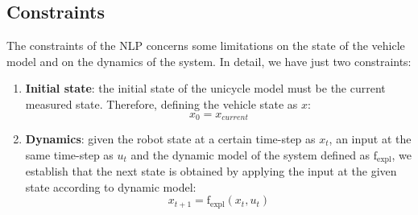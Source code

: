 \subsection{Constraints}
The constraints of the NLP concerns some limitations on the state of the vehicle model 
and on the dynamics of the system. 
In detail, we have just two constraints:
\begin{enumerate}
    \item \textbf{Initial state}: the initial state of the unicycle model must be the current measured state. 
                                  Therefore, defining the vehicle state as $x$:
                                  \begin{equation}
                                    x_0 = x_{current}
                                  \end{equation}
    \item \textbf{Dynamics}: given the robot state at a certain time-step as $x_t$, an input at the same time-step as $u_t$
                             and the dynamic model of the system defined as $\text{f}_\text{expl}$, 
                             we establish that the next state is obtained by applying the input at the given state according to
                             dynamic model:
                             \begin{equation}
                                x_{t+1} = \text{f}_\text{expl}(x_t, u_t)
                             \end{equation} 
\end{enumerate}

